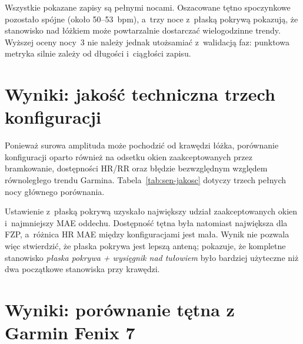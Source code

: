 \documentclass[12pt,a4paper,oneside]{report}
\begin{document}
Wszystkie pokazane zapisy są pełnymi nocami. Oszacowane tętno spoczynkowe
pozostało spójne (około 50--53~bpm), a~trzy noce z~płaską pokrywą pokazują,
że stanowisko nad łóżkiem może powtarzalnie dostarczać wielogodzinne trendy.
Wyższej oceny nocy~3 nie należy jednak utożsamiać z~walidacją faz:
punktowa metryka silnie zależy od długości i~ciągłości zapisu.

\section{Wyniki: jakość techniczna trzech konfiguracji}

Ponieważ surowa amplituda może pochodzić od krawędzi łóżka, porównanie
konfiguracji oparto również na odsetku okien zaakceptowanych przez bramkowanie,
dostępności HR/RR oraz błędzie bezwzględnym względem równoległego trendu
Garmina. Tabela~\ref{tab:sen-jakosc} dotyczy trzech pełnych nocy głównego
porównania.

\begin{table}[H]
\centering
\caption{Techniczna użyteczność trendów dla trzech pełnych nocy. ,,Ważne
okna'' oznaczają status \texttt{valid}, dostępność HR/RR dotyczy
nieinterpolowanych estymat, a~MAE jest średnim błędem bezwzględnym
w~sparowanych oknach snu.}
\label{tab:sen-jakosc}
\small
{}
\end{table}

Ustawienie z~płaską pokrywą uzyskało największy udział zaakceptowanych okien
i~najmniejszy MAE oddechu. Dostępność tętna była natomiast największa dla FZP,
a~różnica HR MAE między konfiguracjami jest mała. Wynik nie pozwala więc
stwierdzić, że płaska pokrywa jest lepszą anteną; pokazuje, że kompletne
stanowisko \emph{płaska pokrywa + wysięgnik nad tułowiem} było bardziej
użyteczne niż dwa początkowe stanowiska przy krawędzi.

\section{Wyniki: porównanie tętna z Garmin Fenix 7}
\end{document}
